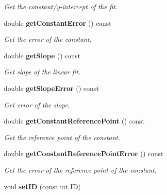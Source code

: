 \begin{DoxyCompactItemize}
\begin{DoxyCompactList}\small\item\em Get the constant/y-\/intercept of the fit. \item\end{DoxyCompactList}\item 
double {\bf getConstantError} () const \label{classCALICE_1_1LinearFitCompound_a1c512b13cee1df98953e18eff78047ac}

\begin{DoxyCompactList}\small\item\em Get the error of the constant. \item\end{DoxyCompactList}\item 
double {\bf getSlope} () const \label{classCALICE_1_1LinearFitCompound_adb11c7794278351a448df3bff3a0bd07}

\begin{DoxyCompactList}\small\item\em Get slope of the linear fit. \item\end{DoxyCompactList}\item 
double {\bf getSlopeError} () const \label{classCALICE_1_1LinearFitCompound_a19e287bdba39f38751496a5b06f28569}

\begin{DoxyCompactList}\small\item\em Get error of the slope. \item\end{DoxyCompactList}\item 
double {\bf getConstantReferencePoint} () const \label{classCALICE_1_1LinearFitCompound_a72a91d14525eedaa7f2f436f6c7fe51e}

\begin{DoxyCompactList}\small\item\em Get the reference point of the constant. \item\end{DoxyCompactList}\item 
double {\bf getConstantReferencePointError} () const \label{classCALICE_1_1LinearFitCompound_a77547513303b8e9df5329c5dd67571ac}

\begin{DoxyCompactList}\small\item\em Get the error of the reference point of the constant. \item\end{DoxyCompactList}\item 
void {\bf setID} (const int ID)\label{classCALICE_1_1LinearFitCompound_af7dcd74ed57f41b64c7ba082c8070246}


\end{DoxyCompactItemize}
